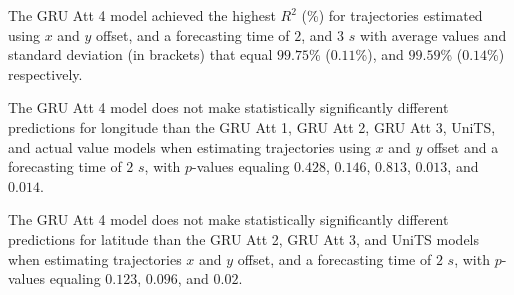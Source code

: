 \begin{table}[!ht]
	\centering
	\caption{The average $R^{2}$ (\%), with standard deviation in brackets, across k-fold validation datasets for the trajectories in the k-fold testing datasets estimated using $x$ and $y$ offset, different RNN models, and forecasting times.}
	\label{tab:best_no_abs_R2}
\end{table}

The GRU Att 4 model achieved the highest $R^{2}$ (\%) for trajectories estimated using $x$ and $y$ offset, and a forecasting time of $2$, and $3$ $s$ with average values and standard deviation (in brackets) that equal $99.75$\% ($0.11$\%), and $99.59$\% ($0.14$\%) respectively.

The GRU Att 4 model does not make statistically significantly different predictions for longitude than the GRU Att 1, GRU Att 2, GRU Att 3, UniTS, and actual value models when estimating trajectories using $x$ and $y$ offset and a forecasting time of $2$ $s$, with $p$-values equaling $0.428$, $0.146$, $0.813$, $0.013$, and $0.014$.

The GRU Att 4 model does not make statistically significantly different predictions for latitude than the GRU Att 2, GRU Att 3, and UniTS models when estimating trajectories $x$ and $y$ offset, and a forecasting time of $2$ $s$, with $p$-values equaling $0.123$, $0.096$, and $0.02$.

